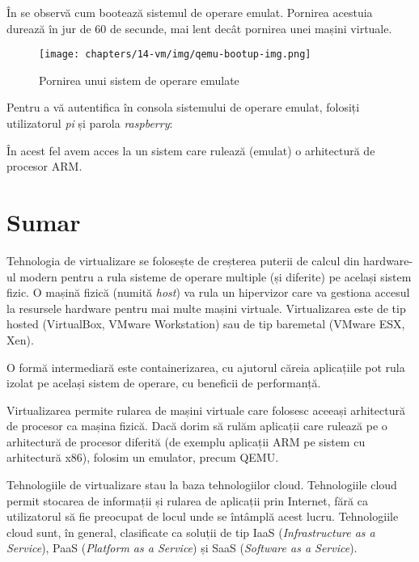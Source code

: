 În  se observă cum bootează sistemul de
operare emulat. Pornirea acestuia durează în jur de 60 de secunde, mai lent
decât pornirea unei mașini virtuale.

\begin{figure}[!htbp]
	\centering
	\texttt{[image: chapters/14-vm/img/qemu-bootup-img.png]}
	\caption{Pornirea unui sistem de operare emulate}
	\label{fig:vm:qemu-bootup}
\end{figure}

Pentru a vă autentifica în consola sistemului de operare emulat, folosiți
utilizatorul \textit{pi} și parola \textit{raspberry}:


În acest fel avem acces la un sistem care rulează (emulat) o arhitectură de procesor ARM.

\section{Sumar}
\label{sec:vm:summary}

Tehnologia de virtualizare se folosește de creșterea puterii de calcul din hardware-ul modern pentru a rula sisteme de operare multiple (și diferite) pe același sistem fizic.
O mașină fizică (numită \textit{host}) va rula un hipervizor care va gestiona accesul la resursele hardware pentru mai multe mașini virtuale.
Virtualizarea este de tip hosted (VirtualBox, VMware Workstation) sau de tip baremetal (VMware ESX, Xen).

O formă intermediară este containerizarea, cu ajutorul căreia aplicațiile pot rula izolat pe același sistem de operare, cu beneficii de performanță.

Virtualizarea permite rularea de mașini virtuale care folosesc aceeași arhitectură de procesor ca mașina fizică.
Dacă dorim să rulăm aplicații care rulează pe o arhitectură de procesor diferită (de exemplu aplicații ARM pe sistem cu arhitectură x86), folosim un emulator, precum QEMU.

Tehnologiile de virtualizare stau la baza tehnologiilor cloud.
Tehnologiile cloud permit stocarea de informații și rularea de aplicații prin Internet, fără ca utilizatorul să fie preocupat de locul unde se întâmplă acest lucru.
Tehnologiile cloud sunt, în general, clasificate ca soluții de tip IaaS (\textit{Infrastructure as a Service}), PaaS (\textit{Platform as a Service}) și SaaS (\textit{Software as a Service}).
